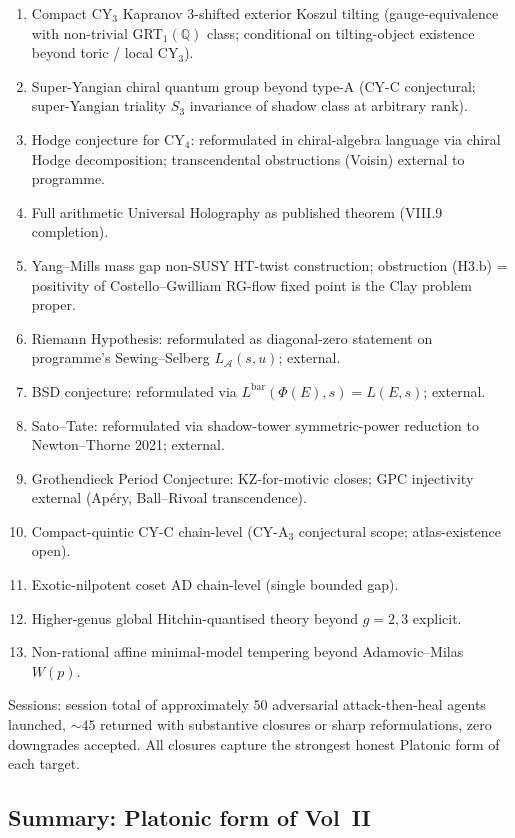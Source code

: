 \documentclass[11pt]{article}
\begin{document}
\begin{remark}
\begin{remark}
\begin{enumerate}
\item[R1] Compact CY$_3$ Kapranov 3-shifted exterior Koszul tilting
(gauge-equivalence with non-trivial GRT$_1(\mathbb{Q})$ class;
conditional on tilting-object existence beyond toric / local CY$_3$).
\item[R2] Super-Yangian chiral quantum group beyond type-A
(CY-C conjectural; super-Yangian triality $S_3$ invariance of
shadow class at arbitrary rank).
\item[R3] Hodge conjecture for CY$_4$: reformulated in chiral-algebra
language via chiral Hodge decomposition; transcendental obstructions
(Voisin) external to programme.
\item[R4] Full arithmetic Universal Holography as published theorem
(VIII.9 completion).
\item[R5] Yang--Mills mass gap non-SUSY HT-twist construction;
obstruction (H3.b) = positivity of Costello--Gwilliam RG-flow fixed
point is the Clay problem proper.
\item[R6] Riemann Hypothesis: reformulated as diagonal-zero statement
on programme's Sewing--Selberg $L_{\mathcal{A}}(s, u)$; external.
\item[R7] BSD conjecture: reformulated via $L^{\mathrm{bar}}(\Phi(E), s)
= L(E, s)$; external.
\item[R8] Sato--Tate: reformulated via shadow-tower symmetric-power
reduction to Newton--Thorne 2021; external.
\item[R9] Grothendieck Period Conjecture: KZ-for-motivic closes;
GPC injectivity external (Apéry, Ball--Rivoal transcendence).
\item[R10] Compact-quintic CY-C chain-level (CY-A$_3$ conjectural
scope; atlas-existence open).
\item[R11] Exotic-nilpotent coset AD chain-level (single bounded
gap).
\item[R12] Higher-genus global Hitchin-quantised theory beyond
$g = 2, 3$ explicit.
\item[R13] Non-rational affine minimal-model tempering beyond
Adamovic--Milas $W(p)$.
\end{enumerate}

Sessions: session total of approximately $50$ adversarial
attack-then-heal agents launched, $\sim 45$ returned with substantive
closures or sharp reformulations, zero downgrades accepted.
All closures capture the strongest honest Platonic form of each
target.

\subsection{Summary: Platonic form of Vol~II}
\label{subsec:session-summary}


\end{remark}
\end{remark}
\end{document}
